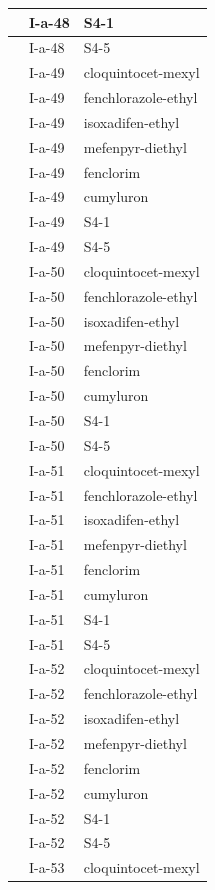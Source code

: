 \documentclass[11pt,a4paper]{article}
\begin{document}
\begin{table}[h]
\begin{tabular}{|l|l|l|}
 & I-a-48 & S4-1 \\ \hline
 & I-a-48 & S4-5 \\ \hline
 & I-a-49 & cloquintocet-mexyl \\ \hline
 & I-a-49 & fenchlorazole-ethyl \\ \hline
 & I-a-49 & isoxadifen-ethyl \\ \hline
 & I-a-49 & mefenpyr-diethyl \\ \hline
 & I-a-49 & fenclorim \\ \hline
 & I-a-49 & cumyluron \\ \hline
 & I-a-49 & S4-1 \\ \hline
 & I-a-49 & S4-5 \\ \hline
 & I-a-50 & cloquintocet-mexyl \\ \hline
 & I-a-50 & fenchlorazole-ethyl \\ \hline
 & I-a-50 & isoxadifen-ethyl \\ \hline
 & I-a-50 & mefenpyr-diethyl \\ \hline
 & I-a-50 & fenclorim \\ \hline
 & I-a-50 & cumyluron \\ \hline
 & I-a-50 & S4-1 \\ \hline
 & I-a-50 & S4-5 \\ \hline
 & I-a-51 & cloquintocet-mexyl \\ \hline
 & I-a-51 & fenchlorazole-ethyl \\ \hline
 & I-a-51 & isoxadifen-ethyl \\ \hline
 & I-a-51 & mefenpyr-diethyl \\ \hline
 & I-a-51 & fenclorim \\ \hline
 & I-a-51 & cumyluron \\ \hline
 & I-a-51 & S4-1 \\ \hline
 & I-a-51 & S4-5 \\ \hline
 & I-a-52 & cloquintocet-mexyl \\ \hline
 & I-a-52 & fenchlorazole-ethyl \\ \hline
 & I-a-52 & isoxadifen-ethyl \\ \hline
 & I-a-52 & mefenpyr-diethyl \\ \hline
 & I-a-52 & fenclorim \\ \hline
 & I-a-52 & cumyluron \\ \hline
 & I-a-52 & S4-1 \\ \hline
 & I-a-52 & S4-5 \\ \hline
 & I-a-53 & cloquintocet-mexyl \\ \hline

\end{tabular}
\end{table}
\end{document}
